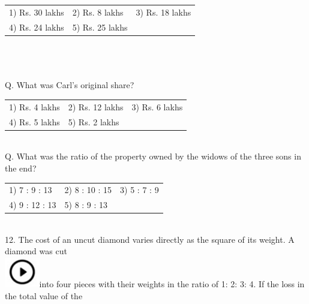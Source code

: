 \documentclass{article}
\begin{document}
\noindent \begin{tabular}{p{1.7in} p{1.6in} p{1.6in}} \\ 
 1) Rs. 30 lakhs                                             &  2) Rs. 8 lakhs                           &  3) Rs. 18 lakhs

\noindent 

\noindent \\
4) Rs. 24 lakhs                                             & 5) Rs. 25 lakhs \\
\end{tabular}

\noindent 

\noindent  \\  

\noindent  \\  

\noindent \\   Q. What was Carl's original share?

\noindent 

\noindent \begin{tabular}{p{1.7in} p{1.6in} p{1.6in}} \\ 
 1) Rs. 4 lakhs                                               &  2) Rs. 12 lakhs                         &  3) Rs. 6 lakhs

\noindent 

\noindent \\
4) Rs. 5 lakhs                                               & 5) Rs. 2 lakhs \\
\end{tabular}

\noindent 

\noindent 

\noindent \\   Q. What was the ratio of the property owned by the widows of the three sons in the end?

\noindent 

\noindent \begin{tabular}{p{1.7in} p{1.6in} p{1.6in}} \\ 
 1) 7 : 9 : 13             &  2) 8 : 10 : 15    &  3) 5 : 7 : 9        \\
4) 9 : 12 : 13    & 5) 8 : 9 : 13 \\
\end{tabular}

\noindent  \\  12. The cost of an uncut diamond varies directly as the square of its weight. A diamond was cut  
	\noindent \\ \includegraphics*[width=0.60in, height=0.52in]{images/image1}into four pieces with their weights in the ratio of 1: 2: 3: 4. If the loss in the total value of the
\end{document}
